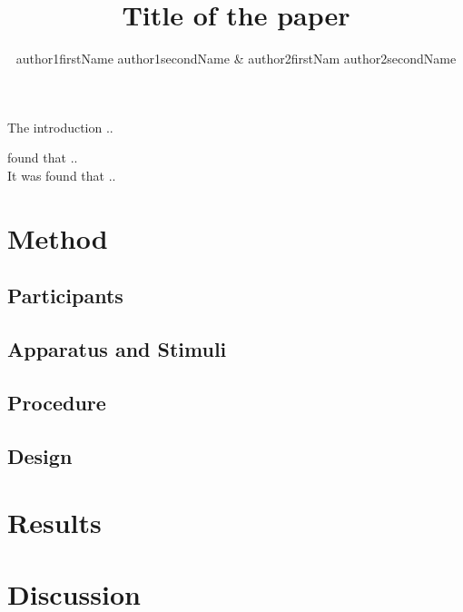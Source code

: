 \documentclass[man, 12pt]{apa6}
\title{Title of the paper}
\author{author1firstName author1secondName \& author2firstNam
author2secondName}
\affiliation{Department of Psychology, University of XXX}
\begin{document}
\maketitle
The introduction .. \textcite{botvinick2001conflict} 

\textcite{botvinick2001conflict} found that .. \\
It was found that .. \parencite[][]{simon1969reactions, eriksen1974effects, stroop1935studies} 

\section{Method}
\subsection{Participants}
\subsection{Apparatus and Stimuli}
\subsection{Procedure}

\subsection{Design}

\section{Results}

\section{Discussion}

\printbibliography
\end{document}
